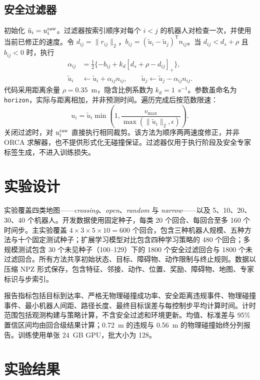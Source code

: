 \documentclass[conference]{IEEEtran}
\begin{document}
\subsection{安全过滤器}
初始化 $\tilde u_i=u_i^{\rm raw}$。过滤器按索引顺序对每个 $i<j$ 的机器人对检查一次，并使用当前已修正的速度。令 $d_{ij}=\|r_{ij}\|_2$，$b_{ij}=(\tilde u_i-\tilde u_j)^{\mathsf T}n_{ij}$。当 $d_{ij}<d_s+\rho$ 且 $b_{ij}<0$ 时，执行
\begin{equation}
\begin{aligned}
\alpha_{ij}&=\tfrac12\{-b_{ij}+k_d[d_s+\rho-d_{ij}]_+\},\\
\tilde u_i&\leftarrow\tilde u_i+\alpha_{ij}n_{ij},\qquad
\tilde u_j\leftarrow\tilde u_j-\alpha_{ij}n_{ij}.
\end{aligned}
\end{equation}
代码采用距离余量 $\rho=0.35$~m，隐含比例系数为 $k_d=1$~s$^{-1}$。参数虽命名为 \texttt{horizon}，实际与距离相加，并非预测时间。遍历完成后按范数限速：
\begin{equation}
u_i=\tilde u_i\min\!\left(1,\frac{v_{\max}}{\max(\|\tilde u_i\|_2,\epsilon)}\right).
\end{equation}
关闭过滤时，对 $u_i^{\rm raw}$ 直接执行相同裁剪。该方法为顺序两两速度修正，并非 ORCA 求解器，也不提供形式化无碰撞保证。过滤器仅用于执行阶段及安全专家标签生成，不进入训练损失。

\section{实验设计}

实验覆盖四类地图——\textit{crossing}、\textit{open}、\textit{random} 与 \textit{narrow}——以及 5、10、20、30、40 个机器人。开发数据使用固定种子，每类 20 个回合、每回合至多 160 个时间步。主实验覆盖 $4\times3\times5\times10=600$ 个回合，包含三种机器人规模、五种方法与十个固定测试种子；扩展学习模型对比包含四种学习策略的 480 个回合；多规模测试包含 30 个未见种子（100--129）下的 1800 个安全过滤回合与 1800 个未过滤回合。所有方法共享初始状态、目标、障碍物、动作限制与终止规则。数据以压缩 NPZ 形式保存，包含特征、邻接、动作、位置、奖励、障碍物、地图、专家标识与步索引。

报告指标包括目标到达率、严格无物理碰撞成功率、安全距离违规事件、物理碰撞事件、最小机器人间距、路径长度、最终目标误差与每控制步平均计算时间。计时范围包括观测构建与策略计算，不含安全过滤和环境更新。均值、标准差与 95\% 置信区间均由回合级结果计算；0.72~m 的违规与 0.56~m 的物理碰撞始终分列报告。训练使用单张 24~GB GPU，批大小为 128。

\section{实验结果}
\label{sec:results}
\end{document}
